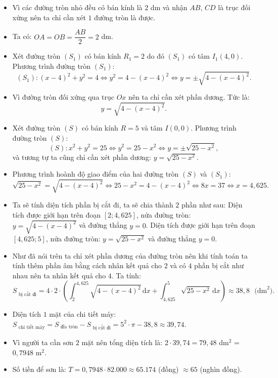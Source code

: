 \begin{bt}
{		\begin{itemize}
			\item Vì các đường tròn nhỏ đều có bán kính là $2$ dm và nhận  $AB$, $CD$ là trục đối xứng nên ta chỉ cần xét $1$ đường tròn là được.
			\item Ta có: $OA=OB=\dfrac{AB}{2}=2$ dm. 
			\item Xét đường tròn $(S_1)$ có bán kính $R_1=2$ do đó $(S_1)$ có tâm $I_1(4,0)$. Phương trình  đường tròn $(S_1)$:
			$$(S_1):(x-4)^2+y^2=4 \Leftrightarrow y^2=4-(x-4)^2  \Leftrightarrow y=\pm \sqrt{4-(x-4)^2}.$$
			\item Vì đường tròn đối xứng qua trục $Ox$ nên ta chỉ cần xét phần dương. Tức  là: $$y= \sqrt{4-(x-4)^2}.$$
			\item Xét đường tròn  $(S)$ có bán kính $R=5$ và tâm $I(0,0)$. Phương trình đường tròn $(S)$:
			$$(S):x^2+y^2=25 \Leftrightarrow y^2=25-x^2 \Leftrightarrow y=\pm \sqrt{25-x^2},$$ và tương tự ta cũng chỉ cần  xét phần dương: $y=\sqrt{25-x^2}$.
			\item Phương trình hoành độ giao điểm  của hai đường tròn $(S)$ và $(S_1)$:
			$$\sqrt{25-x^2} = \sqrt{4-(x-4)^2} \Leftrightarrow 25-x^2 =4-(x-4)^2 \Leftrightarrow  8x=37 \Leftrightarrow x =4{,}625.$$
			\item  Ta sẽ tính diện tích phần bị cắt đi, ta sẽ chia thành $2$ phần như sau:
		\subitem Diện tích được giới hạn trên đoạn $[2;4{,}625]$, nửa đường  tròn: $y=\sqrt{4-(x-4)^2}$ và đường thẳng $y=0$.
		\subitem Diện tích được giới hạn trên đoạn $[4{,}625;5]$, nửa đường tròn: $y=\sqrt{25-x^2}$ và đường thẳng  $y=0$.
			\item Như đã nói trên ta chỉ xét phần dương của đường tròn nên khi tính toán ta tính thêm phần âm bằng cách nhân kết quả cho $2$ và có $4$ phần bị cắt  như nhau nên ta nhân kết quả cho $4$. Ta tính:
			$$S_{\text{ bị cắt đi}}=4\cdot 2 \cdot \left(\int_{2}^{4{,}625}\sqrt{4-(x-4)^2} \mathrm{\,d}x+\int_{4{,}625}^{5}\sqrt{25-x^2} \mathrm{\,d}x\right) \approx 38{,}8\text{ $($dm}^2).$$ 
			\item Diện tích $1$ mặt của chi tiết máy: $S_{\text{ chi tiết máy}}=S_{\text{ đĩa tròn}}-S_{\text{ bị cắt đi}}=5^2\cdot \pi - 38{,}8 \approx 39{,}74$. 
			\item Vì người ta cần sơn $2$ mặt  nên tổng diện tích là: $2\cdot 39{,}74=79{,}48$ dm$^2$ = $0{,}7948$ m$^2$.
			\item Số tiền để sơn là: $T=0{,}7948 \cdot 82.000\approx  65.174$ (đồng) $\approx 65$ (nghìn đồng).
	\end{itemize}}
\end{bt}

